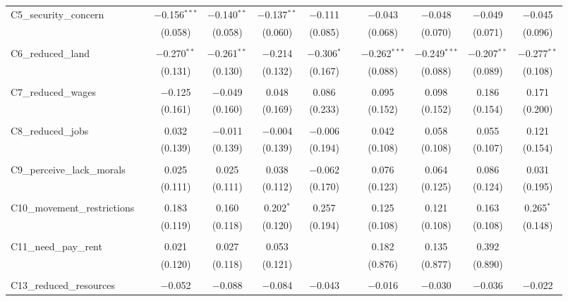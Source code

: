 \begin{table}[H]
\begin{tabular}{@{\extracolsep{4pt}}lcccccccccc}
 C5\_security\_concern &  & $-$0.156$^{***}$ & $-$0.140$^{**}$ & $-$0.137$^{**}$ & $-$0.111 &  & $-$0.043 & $-$0.048 & $-$0.049 & $-$0.045 \\ 
  &  & (0.058) & (0.058) & (0.060) & (0.085) &  & (0.068) & (0.070) & (0.071) & (0.096) \\ 
  & & & & & & & & & & \\ 
 C6\_reduced\_land &  & $-$0.270$^{**}$ & $-$0.261$^{**}$ & $-$0.214 & $-$0.306$^{*}$ &  & $-$0.262$^{***}$ & $-$0.249$^{***}$ & $-$0.207$^{**}$ & $-$0.277$^{**}$ \\ 
  &  & (0.131) & (0.130) & (0.132) & (0.167) &  & (0.088) & (0.088) & (0.089) & (0.108) \\ 
  & & & & & & & & & & \\ 
 C7\_reduced\_wages &  & $-$0.125 & $-$0.049 & 0.048 & 0.086 &  & 0.095 & 0.098 & 0.186 & 0.171 \\ 
  &  & (0.161) & (0.160) & (0.169) & (0.233) &  & (0.152) & (0.152) & (0.154) & (0.200) \\ 
  & & & & & & & & & & \\ 
 C8\_reduced\_jobs &  & 0.032 & $-$0.011 & $-$0.004 & $-$0.006 &  & 0.042 & 0.058 & 0.055 & 0.121 \\ 
  &  & (0.139) & (0.139) & (0.139) & (0.194) &  & (0.108) & (0.108) & (0.107) & (0.154) \\ 
  & & & & & & & & & & \\ 
 C9\_perceive\_lack\_morals &  & 0.025 & 0.025 & 0.038 & $-$0.062 &  & 0.076 & 0.064 & 0.086 & 0.031 \\ 
  &  & (0.111) & (0.111) & (0.112) & (0.170) &  & (0.123) & (0.125) & (0.124) & (0.195) \\ 
  & & & & & & & & & & \\ 
 C10\_movement\_restrictions &  & 0.183 & 0.160 & 0.202$^{*}$ & 0.257 &  & 0.125 & 0.121 & 0.163 & 0.265$^{*}$ \\ 
  &  & (0.119) & (0.118) & (0.120) & (0.194) &  & (0.108) & (0.108) & (0.108) & (0.148) \\ 
  & & & & & & & & & & \\ 
 C11\_need\_pay\_rent &  & 0.021 & 0.027 & 0.053 &  &  & 0.182 & 0.135 & 0.392 &  \\ 
  &  & (0.120) & (0.118) & (0.121) &  &  & (0.876) & (0.877) & (0.890) &  \\ 
  & & & & & & & & & & \\ 
 C13\_reduced\_resources &  & $-$0.052 & $-$0.088 & $-$0.084 & $-$0.043 &  & $-$0.016 & $-$0.030 & $-$0.036 & $-$0.022 \\ 

\end{tabular}
\end{table}
